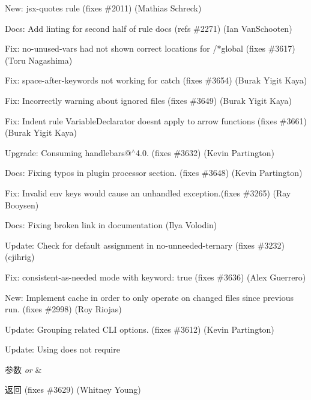 \begin{DoxyItemize}
\item New\+: {\ttfamily jsx-\/quotes} rule (fixes \#2011) (Mathias Schreck)
\item Docs\+: Add linting for second half of rule docs (refs \#2271) (Ian Van\+Schooten)
\item Fix\+: {\ttfamily no-\/unused-\/vars} had not shown correct locations for {\ttfamily /$\ast$global} (fixes \#3617) (Toru Nagashima)
\item Fix\+: {\ttfamily space-\/after-\/keywords} not working for {\ttfamily catch} (fixes \#3654) (Burak Yigit Kaya)
\item Fix\+: Incorrectly warning about ignored files (fixes \#3649) (Burak Yigit Kaya)
\item Fix\+: Indent rule Variable\+Declarator doesn\textquotesingle{}t apply to arrow functions (fixes \#3661) (Burak Yigit Kaya)
\item Upgrade\+: Consuming handlebars@$^\wedge$4.0. (fixes \#3632) (Kevin Partington)
\item Docs\+: Fixing typos in plugin processor section. (fixes \#3648) (Kevin Partington)
\item Fix\+: Invalid env keys would cause an unhandled exception.(fixes \#3265) (Ray Booysen)
\item Docs\+: Fixing broken link in documentation (Ilya Volodin)
\item Update\+: Check for default assignment in no-\/unneeded-\/ternary (fixes \#3232) (cjihrig)
\item Fix\+: {\ttfamily consistent-\/as-\/needed} mode with {\ttfamily keyword\+: true} (fixes \#3636) (Alex Guerrero)
\item New\+: Implement cache in order to only operate on changed files since previous run. (fixes \#2998) (Roy Riojas)
\item Update\+: Grouping related C\+LI options. (fixes \#3612) (Kevin Partington)
\item Update\+: Using  does not require
\begin{DoxyParams}{参数}
{\em or} & \\
\hline
\end{DoxyParams}
\begin{DoxyReturn}{返回}
(fixes \#3629) (Whitney Young)
\end{DoxyReturn}


\end{DoxyItemize}
